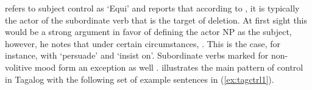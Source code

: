 \citet{kroeger1991} refers to subject control as `Equi' and reports that
according to \citet[505]{schachter1976}, it is typically the actor of the
subordinate verb that is the target of deletion. At first sight this would be a
strong argument in favor of defining the actor NP as the subject, however, he
notes that under certain circumstances, . This is the case, for instance, with  `persuade' and
 `insist on'. Subordinate verbs marked for non-volitive
mood form an exception as well \citep[36--37, also 96--97]{kroeger1991}.
\citet{kroeger1991} illustrates the main pattern of control in Tagalog with the
following set of example sentences in (\ref{ex:tagctrl1}).

